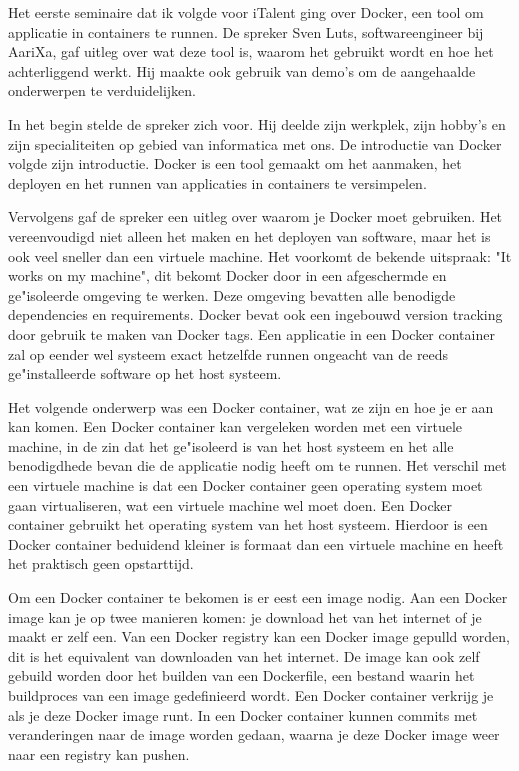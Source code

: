 
Het eerste seminaire dat ik volgde voor iTalent ging over Docker, een tool om applicatie in containers te runnen. De spreker Sven Luts, softwareengineer bij AariXa, gaf uitleg over wat deze tool is, waarom het gebruikt wordt en hoe het achterliggend werkt. Hij maakte ook gebruik van demo's om de aangehaalde onderwerpen te verduidelijken.

In het begin stelde de spreker zich voor. Hij deelde zijn werkplek, zijn hobby's en zijn specialiteiten op gebied van informatica met ons. De introductie van Docker volgde zijn introductie. Docker is een tool gemaakt om het aanmaken, het deployen en het runnen van applicaties in containers te versimpelen.

Vervolgens gaf de spreker een uitleg over waarom je Docker moet gebruiken. Het vereenvoudigd niet alleen het maken en het deployen van software, maar het is ook veel sneller dan een virtuele machine. Het voorkomt de bekende uitspraak: "It works on my machine", dit bekomt Docker door in een afgeschermde en ge"isoleerde omgeving te werken. Deze omgeving bevatten alle benodigde dependencies en requirements. Docker bevat ook een ingebouwd version tracking door gebruik te maken van Docker tags. Een applicatie in een Docker container zal op eender wel systeem exact hetzelfde runnen ongeacht van de reeds ge"installeerde software op het host systeem.

Het volgende onderwerp was een Docker container, wat ze zijn en hoe je er aan kan komen. Een Docker container kan vergeleken worden met een virtuele machine, in de zin dat het ge"isoleerd is van het host systeem en het alle benodigdhede bevan die de applicatie nodig heeft om te runnen. Het verschil met een virtuele machine is dat een Docker container geen operating system moet gaan virtualiseren, wat een virtuele machine wel moet doen. Een Docker container gebruikt het operating system van het host systeem. Hierdoor is een Docker container beduidend kleiner is formaat dan een virtuele machine en heeft het praktisch geen opstarttijd.

Om een Docker container te bekomen is er eest een image nodig. Aan een Docker image kan je op twee manieren komen: je download het van het internet of je maakt er zelf een. Van een Docker registry kan een Docker image gepulld worden, dit is het equivalent van downloaden van het internet. De image kan ook zelf gebuild worden door het builden van een Dockerfile, een bestand waarin het buildproces van een image gedefinieerd wordt. Een Docker container verkrijg je als je deze Docker image runt. In een Docker container kunnen commits met veranderingen naar de image worden gedaan, waarna je deze Docker image weer naar een registry kan pushen.

